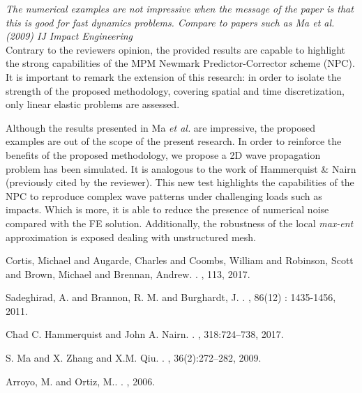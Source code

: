 \documentclass[12pt]{article}
\begin{document}
 \textit{The numerical examples are not impressive when the message of the paper is that this is good for fast dynamics problems. Compare to papers such as Ma et al. (2009) IJ Impact Engineering}\\

Contrary to the reviewer\textquotesingle s opinion, the provided results are capable to highlight the strong capabilities of the MPM Newmark Predictor-Corrector scheme (NPC). It is important to remark the extension of this research: in order to isolate the strength of the proposed methodology, covering spatial and time discretization, only linear elastic problems are assessed. 

Although the results presented in Ma {\it et al.} \cite{MA2009272} are impressive, the proposed examples are out of the scope of the present research. In order to reinforce the benefits of the proposed methodology, we propose a 2D wave propagation problem has been simulated. It is analogous to the work of Hammerquist \& Nairn \cite{HAMMERQUIST2017724} (previously cited by the reviewer). This new test highlights the capabilities of the NPC to reproduce complex wave patterns under challenging loads such as impacts. Which is more, it is able to reduce the presence of numerical noise compared with the FE solution. Additionally, the robustness of the local \textit{max-ent} approximation is exposed dealing with unstructured mesh. 


\begin{thebibliography}{10}

Cortis, Michael and Augarde, Charles and Coombs, William and Robinson, Scott and Brown, Michael and Brennan, Andrew.
.
, 113, 2017.

Sadeghirad, A. and Brannon, R. M. and Burghardt, J.
.
, 86(12) : 1435-1456, 2011.


Chad C. Hammerquist and John A. Nairn.
.
,  318:724--738, 2017.


S. Ma and X. Zhang and X.M. Qiu.
.
, 36(2):272--282, 2009.

Arroyo, M. and Ortiz, M..
.
,  2006.

\end{thebibliography}
\end{document}
